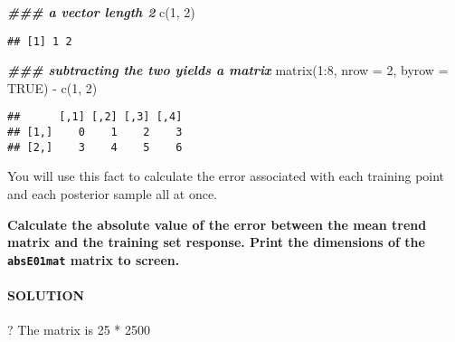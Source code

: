 \documentclass[
]{article}
\newenvironment{Shaded}{\begin{snugshade}}{\end{snugshade}}
\newcommand{\AttributeTok}[1]{\textcolor[rgb]{0.77,0.63,0.00}{#1}}
\newcommand{\ConstantTok}[1]{\textcolor[rgb]{0.00,0.00,0.00}{#1}}
\newcommand{\DecValTok}[1]{\textcolor[rgb]{0.00,0.00,0.81}{#1}}
\newcommand{\DocumentationTok}[1]{\textcolor[rgb]{0.56,0.35,0.01}{\textbf{\textit{#1}}}}
\newcommand{\FunctionTok}[1]{\textcolor[rgb]{0.00,0.00,0.00}{#1}}
\newcommand{\NormalTok}[1]{#1}
\newcommand{\OtherTok}[1]{\textcolor[rgb]{0.56,0.35,0.01}{#1}}
\newcommand{\SpecialCharTok}[1]{\textcolor[rgb]{0.00,0.00,0.00}{#1}}
\begin{document}
\begin{Shaded}
\begin{Highlighting}[]
\DocumentationTok{\#\#\# a vector length 2}
\FunctionTok{c}\NormalTok{(}\DecValTok{1}\NormalTok{, }\DecValTok{2}\NormalTok{)}
\end{Highlighting}
\end{Shaded}

\begin{verbatim}
## [1] 1 2
\end{verbatim}

\begin{Shaded}
\begin{Highlighting}[]
\DocumentationTok{\#\#\# subtracting the two yields a matrix}
\FunctionTok{matrix}\NormalTok{(}\DecValTok{1}\SpecialCharTok{:}\DecValTok{8}\NormalTok{, }\AttributeTok{nrow =} \DecValTok{2}\NormalTok{, }\AttributeTok{byrow =} \ConstantTok{TRUE}\NormalTok{) }\SpecialCharTok{{-}} \FunctionTok{c}\NormalTok{(}\DecValTok{1}\NormalTok{, }\DecValTok{2}\NormalTok{)}
\end{Highlighting}
\end{Shaded}

\begin{verbatim}
##      [,1] [,2] [,3] [,4]
## [1,]    0    1    2    3
## [2,]    3    4    5    6
\end{verbatim}

You will use this fact to calculate the error associated with each
training point and each posterior sample all at once.

\textbf{Calculate the absolute value of the error between the mean trend
matrix and the training set response. Print the dimensions of the
\texttt{absE01mat} matrix to screen.}

\hypertarget{solution-9}{%
\paragraph{SOLUTION}\label{solution-9}}

? The matrix is 25 * 2500

\begin{Shaded}
\end{Shaded}
\end{document}
